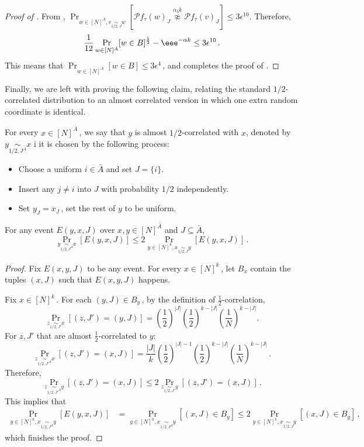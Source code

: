 \documentclass{toc}
\newcommand{\Prob}[2][]{\Pr_{{#1}}\left[#2\right]} %
\newcommand{\Paren}[1]{\left(#1\right)} %
\newcommand{\brac}[1]{[#1]} %
\newcommand{\set}[1]{\{#1\}} %
\newcommand\f{f} %
\newcommand\bh{\mathcal{P}\f_\tau} %
\newcommand\neqg[1]{\stackrel{{#1}}{ \not\approx}} %
\newcommand\cor[1]{\underset{\scriptscriptstyle#1}{\sim}} %
\newcommand\acor[1]{\underset{\scriptscriptstyle#1^A}{\sim}} %
\newcommand\rest[1]{{\bar{#1}}}  %
\begin{document}
\begin{proof}[Proof of ]
	From , $\Prob[{w\in\brac{N}^{\bar{A}},v\cor{1/2,J}{w}}]{\bh(w)_J\neqg{\alpha_3 k} \bh(v)_J}\leq 3\epsilon^{10}.$ Therefore,
	\begin{align}\label{eq:upper BC}
		\frac{1}{12}\Pr_{w\in[N]^{\bar{A}}}[w\in B]^\frac{5}{2} - \eee^{-\alpha k} \leq 3\epsilon^{10}\,. %
	\end{align}
	This means that $\Pr_{w\in[N]^{\bar{A}}}[w\in B] \leq 3\epsilon^4$\,,
and completes the proof of .
\end{proof}

Finally, we are left with proving the following claim, relating the standard 
%
%
%
$1/2$-correlated %
distribution to an almost correlated version in which one extra random coordinate is identical.
\begin{definition}
    For every $x\in[N]^{\rest{A}}$\,, we say that $y$ is almost 
%
%
$1/2$-correlated %
with $x$, denoted by $y\acor{1/2,J}x$ i it is chosen by the following process:
    \begin{itemize}
    \item Choose a uniform $i\in\rest{A}$ and set $J=\set{i}$.
    \item Insert any $j\neq i$ into $J$ with probability 
    $1/2$ %
     independently.
    \item Set $y_J = x_J$\,, set the rest of $y$ to be uniform.
    \end{itemize}
\end{definition}
\begin{claim} \label{claim:almost cor sim cor}
	For any event $E(y,x,J)$ over $x,y\in[N]^{\rest{A}}$ and $J\subseteq\rest{A}$,
	\[\Prob[y\acor{1/2,J}x]{E(y,x,J)}\leq 2\Prob[y\in\brac{N}^k,x\cor{1/2,J}{y}]{E(y,x,J)}\,. \]%
\end{claim}

\begin{proof}
	Fix $E(x,y,J)$ to be any event.
	For every $x\in [N]^{k}$\,, let $B_x$ contain the tuples $(x,J)$ such that $E(x,y,J)$ happens.	%
	
	Fix $x\in \brac{N}^k$\,. For each $(y,J)\in B_y$\,, by the definition of $\frac{1}{2}$-correlation,
	\[\Prob[z \cor{1/2,J'}{x}]{(z,J') = (y,J)} = \Paren{\frac{1}{2}}^{|J|}\Paren{\frac{1}{2}}^{k-|J|}\left(\frac{1}{N}\right)^{k-|J|}.\]
For $z,J'$ that are almost 
$\frac{1}{2}$-correlated %
to $y$:
	\[\Prob[z \acor{1/2,J'}{x}]{(z,J') = (x,J)} = \frac{|J|}{k}\Paren{\frac{1}{2}}^{|J| - 1}\Paren{\frac{1}{2}}^{k-|J|}\left(\frac{1}{N}\right)^{k-|J|}\,.\]%
	Therefore,
	\[\Prob[z\acor{1/2,J'}y]{(z,J') = (x,J)}\leq 2\Prob[z \cor{1/2,J'}{y}]{(z,J') = (x,J)}\,.\]%
	This implies that
	\begin{align*}
	\Prob[y\in \brac{N}^k,x \acor{1/2,J}y]{E(y,x,J)} &= \Prob[y\in \brac{N}^k,x \acor{1/2,J}y]{(x,J)\in B_y}\leq 2\Prob[y\in \brac{N}^k,x \cor{1/2,J}{y}]{(x,J)\in B_y}\,,%
	\end{align*}
	which finishes the proof.
\end{proof}
\end{document}
